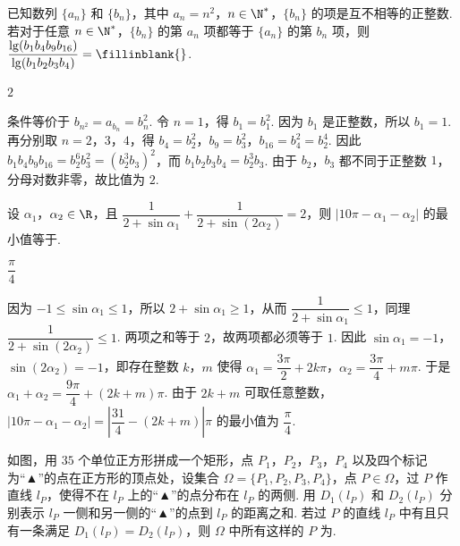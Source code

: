 \begin{problem}
已知数列 \(\{a_n\}\) 和 \(\{b_n\}\)，其中 \(a_n=n^2\)，\(n\in\N^*\)，\(\{b_n\}\) 的项是互不相等的正整数. 若对于任意 \(n\in\N^*\)，\(\{b_n\}\) 的第 \(a_n\) 项都等于 \(\{a_n\}\) 的第 \(b_n\) 项，则 \(\dfrac{\lg(b_1b_4b_9b_{16})}{\lg(b_1b_2b_3b_4)}=\fillinblank{}\).
\end{problem}

\begin{answer}
\(2\)
\end{answer}

\begin{solution}
条件等价于 \(b_{n^2}=a_{b_n}=b_n^2\). 令 \(n=1\)，得 \(b_1=b_1^2\). 因为 \(b_1\) 是正整数，所以 \(b_1=1\). 再分别取 \(n=2\)，\(3\)，\(4\)，得 \(b_4=b_2^2\)，\(b_9=b_3^2\)，\(b_{16}=b_4^2=b_2^4\). 因此
\(b_1b_4b_9b_{16}=b_2^6b_3^2=(b_2^3b_3)^2\)，而 \(b_1b_2b_3b_4=b_2^3b_3\). 由于 \(b_2\)，\(b_3\) 都不同于正整数 \(1\)，分母对数非零，故比值为 \(2\).
\end{solution}

\begin{problem}
设 \(\alpha_1\)，\(\alpha_2\in\R\)，且 \(\dfrac1{2+\sin\alpha_1}+\dfrac1{2+\sin(2\alpha_2)}=2\)，则 \(\lvert10\pi-\alpha_1-\alpha_2\rvert\) 的最小值等于\fillinblank{}.
\end{problem}

\begin{answer}
\(\dfrac\pi4\)
\end{answer}

\begin{solution}
因为 \(-1\le\sin\alpha_1\le1\)，所以 \(2+\sin\alpha_1\ge1\)，从而 \(\dfrac1{2+\sin\alpha_1}\le1\)，同理 \(\dfrac1{2+\sin(2\alpha_2)}\le1\). 两项之和等于 \(2\)，故两项都必须等于 \(1\). 因此 \(\sin\alpha_1=-1\)，\(\sin(2\alpha_2)=-1\)，即存在整数 \(k\)，\(m\) 使得 \(\alpha_1=\dfrac{3\pi}{2}+2k\pi\)，\(\alpha_2=\dfrac{3\pi}{4}+m\pi\). 于是 \(\alpha_1+\alpha_2=\dfrac{9\pi}{4}+(2k+m)\pi\). 由于 \(2k+m\) 可取任意整数，\(\lvert10\pi-\alpha_1-\alpha_2\rvert=\left\lvert\dfrac{31}{4}-(2k+m)\right\rvert\pi\) 的最小值为 \(\dfrac\pi4\).
\end{solution}

\begin{problem}
如图，用 \(35\) 个单位正方形拼成一个矩形，点 \(P_1\)，\(P_2\)，\(P_3\)，\(P_4\) 以及四个标记为“▲”的点在正方形的顶点处，设集合 \(\Omega=\{P_1,P_2,P_3,P_4\}\)，点 \(P\in\Omega\)，过 \(P\) 作直线 \(l_P\)，使得不在 \(l_P\) 上的“▲”的点分布在 \(l_P\) 的两侧. 用 \(D_1(l_P)\) 和 \(D_2(l_P)\) 分别表示 \(l_P\) 一侧和另一侧的“▲”的点到 \(l_P\) 的距离之和. 若过 \(P\) 的直线 \(l_P\) 中有且只有一条满足 \(D_1(l_P)=D_2(l_P)\)，则 \(\Omega\) 中所有这样的 \(P\) 为\fillinblank{}.

\end{problem}

